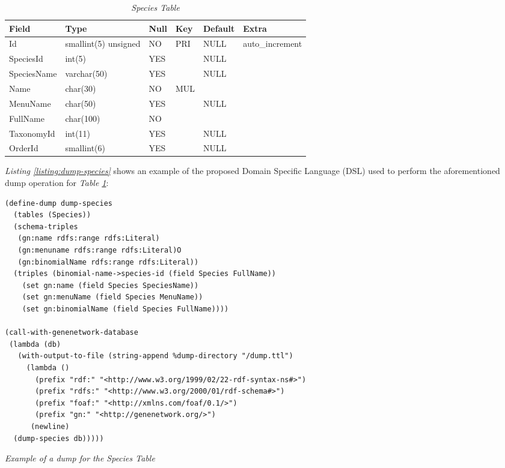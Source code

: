 \begin{table}[h!]
  \centering
  \begin{tabular}{llllll}
    Field & Type & Null & Key & Default & Extra\\
    \hline
    Id & smallint(5) unsigned & NO & PRI & NULL & auto\_increment\\
    SpeciesId & int(5) & YES &  & NULL & \\
    SpeciesName & varchar(50) & YES &  & NULL & \\
    Name & char(30) & NO & MUL &  & \\
    MenuName & char(50) & YES &  & NULL & \\
    FullName & char(100) & NO &  &  & \\
    TaxonomyId & int(11) & YES &  & NULL & \\
    OrderId & smallint(6) & YES &  & NULL & \\
    \hline
  \end{tabular}
  \caption{\textit{Species Table}}
  \label{table:species}
\end{table}

\textit{Listing \ref{listing:dump-species}} shows an example of the proposed Domain Specific Language (DSL) used to perform the aforementioned dump operation for \textit{Table \ref{table:species}}:

\begin{listing}[H]
\begin{verbatim}
(define-dump dump-species
  (tables (Species))
  (schema-triples
   (gn:name rdfs:range rdfs:Literal)
   (gn:menuname rdfs:range rdfs:Literal)O
   (gn:binomialName rdfs:range rdfs:Literal))
  (triples (binomial-name->species-id (field Species FullName))
    (set gn:name (field Species SpeciesName))
    (set gn:menuName (field Species MenuName))
    (set gn:binomialName (field Species FullName))))

(call-with-genenetwork-database
 (lambda (db)
   (with-output-to-file (string-append %dump-directory "/dump.ttl")
     (lambda ()
       (prefix "rdf:" "<http://www.w3.org/1999/02/22-rdf-syntax-ns#>")
       (prefix "rdfs:" "<http://www.w3.org/2000/01/rdf-schema#>")
       (prefix "foaf:" "<http://xmlns.com/foaf/0.1/>")
       (prefix "gn:" "<http://genenetwork.org/>") 
      (newline)
  (dump-species db)))))
\end{verbatim}
\caption{\textit{Example of a dump for the Species Table}}
\label{listing:dump-species}
\end{listing}

